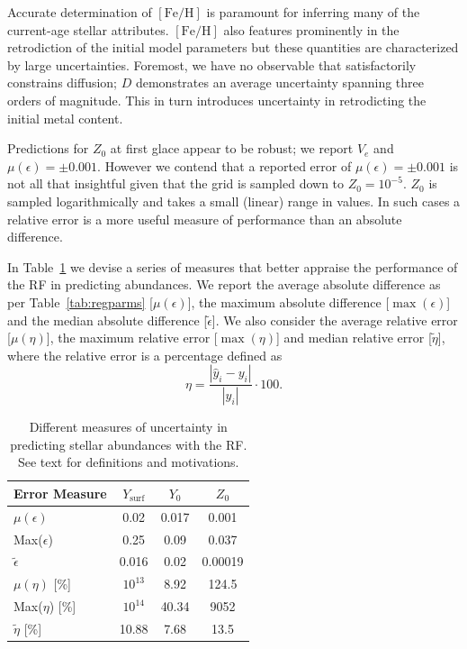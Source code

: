 Accurate determination of $[\text{Fe/H}]$ is paramount for inferring many of the current-age stellar attributes. $[\text{Fe/H}]$ also features prominently in the retrodiction of the initial model parameters but these quantities are characterized by large uncertainties. Foremost, we have no observable that satisfactorily constrains diffusion; $D$ demonstrates an average uncertainty spanning three orders of magnitude. This in turn introduces uncertainty in retrodicting the initial metal content. 

Predictions for $Z_0$ at first glace appear to be robust; we report $V_e$ and  ${\mu (\epsilon) = \pm 0.001}$. However we contend that a reported error of  ${\mu (\epsilon) = \pm 0.001}$ is not all that insightful given that the grid is sampled down to ${Z_0 = 10^{-5}}$. $Z_0$ is sampled logarithmically and takes a small (linear) range in values. In such cases   a relative error is a more useful measure of performance than an absolute difference. 


In Table~\ref{tab:relabunds} we devise a series of measures that better appraise the performance of the RF in predicting abundances. We report the average absolute difference as per Table~\ref{tab:regparms} [${\mu (\epsilon)}$], the maximum absolute difference [${\max(\epsilon)}$] and the median absolute difference [${\tilde{\epsilon}}$]. We also consider the average relative error [${\mu (\eta)}$], the maximum relative error [${\max(\eta)}$] and median relative error [$\tilde{\eta}$], where the relative error is a percentage defined as
\begin{equation}
  \eta= \frac{| \hat y_i - y_i |}{|y_i|} \cdot 100.
\end{equation}


\begin{table}
\centering
\caption{Different measures of uncertainty in predicting stellar abundances with the RF. See text for definitions and motivations.}
    \begin{tabular}{lccc}
 \hline \hline
 Error Measure& $Y_{\text{surf}}$ & $Y_0$ & $Z_0$ \\ \hline
 $\mu (\epsilon)$                 & 0.02 &0.017 & 0.001 \\
 Max($\epsilon$)             & 0.25 &0.09   & 0.037\\    
$\tilde {\epsilon}$          & 0.016  &0.02     &0.00019\\
$\mu (\eta)$ [\%]       & $10^{13}$ &8.92& 124.5 \\ 
  Max($\eta$) [\%]   & $10^{14}$ &40.34  & 9052 \\
$\tilde {\eta}$  [\%] & 10.88 &7.68  & 13.5 \\
\hline
\end{tabular}
\label{tab:relabunds}
\end{table}


